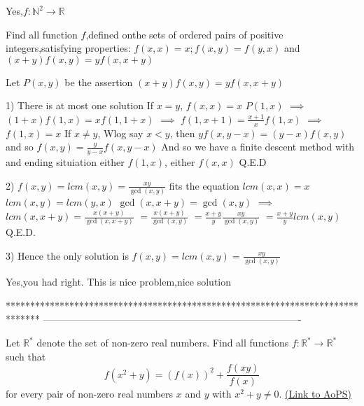 \begin{solution}
	Yes,$ f: \mathbb{N}^{2}\to\mathbb{R}$
\end{solution}



\begin{solution}
	\begin{tcolorbox}Find all function $ f$,defined onthe sets of ordered pairs of positive integers,satisfying properties:
 $ f(x,x) = x; f(x,y) = f(y,x)$ and $ (x + y)f(x,y) = yf(x,x + y)$\end{tcolorbox}

Let $ P(x,y)$ be the assertion $ (x + y)f(x,y) = yf(x,x + y)$

1) There is at most one solution
If $ x=y$, $ f(x,x)=x$
$ P(1,x)$ $ \implies$ $ (1+x)f(1,x) = xf(1,1+x)$ $ \implies$ $ f(1,x+1)=\frac{x+1}xf(1,x)$ $ \implies$ $ f(1,x)=x$
If $ x\neq y$, Wlog say $ x<y$, then $ yf(x,y-x) = (y-x)f(x,y)$ and so $ f(x,y)=\frac{y}{y-x}f(x,y-x)$
And so we have a finite descent method with and ending situiation either $ f(1,x)$, either $ f(x,x)$
Q.E.D

2) $ f(x,y)=lcm(x,y)=\frac{xy}{\gcd(x,y)}$ fits the equation
$ lcm(x,x)=x$
$ lcm(x,y)=lcm(y,x)$
$ \gcd(x,x+y)=\gcd(x,y)$ $ \implies$ $ lcm(x,x+y)=\frac{x(x+y)}{\gcd(x,x+y)}$ $ =\frac{x(x+y)}{\gcd(x,y)}$ $ =\frac{x+y}{y}\frac{xy}{\gcd(x,y)}$ $ =\frac{x+y}{y}lcm(x,y)$
Q.E.D.

3) Hence the only solution is $ f(x,y)=lcm(x,y)=\frac{xy}{\gcd(x,y)}$
\end{solution}



\begin{solution}
	Yes,you had right.
This is nice problem,nice solution 
\end{solution}
*******************************************************************************
-------------------------------------------------------------------------------

\begin{problem}
	Let $ \mathbb R^*$ denote the set of non-zero real numbers. Find all functions $ f: \mathbb R^*\rightarrow \mathbb R^*$ such that
\[ f(x^2+y)=(f(x))^2+\frac{f(xy)}{f(x)}\]
for every pair of non-zero real numbers $ x$ and $y$ with $ x^2+y\not= 0$.
	\flushright \href{https://artofproblemsolving.com/community/c6h283517}{(Link to AoPS)}
\end{problem}



